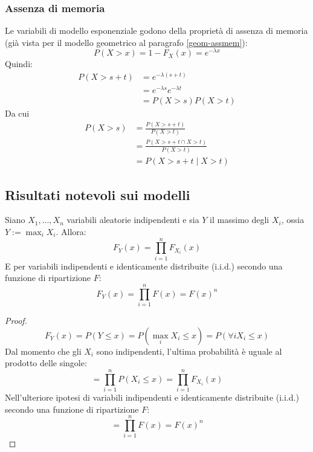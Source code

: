 \subsubsection{Assenza di memoria}
Le variabili di modello esponenziale godono della proprietà di assenza di memoria (già vista per il modello geometrico al paragrafo \ref{geom-assmem}):
\begin{equation*}
	P(X>x) = 1 - F_X(x) = e^{-\lambda x}
\end{equation*}
Quindi:
\begin{align*}
	P(X>s+t) & = e^{-\lambda (s+t)}           \\
	         & = e^{-\lambda s}e^{-\lambda t} \\
	         & = P(X>s)P(X>t)
\end{align*}
Da cui
\begin{align*}
	P(X>s) & = \frac{P(X>s+t)}{P(X>t)}         \\
	       & = \frac{P(X>s+t\cap X>t)}{P(X>t)} \\
	       & = P(X>s+t\mid X>t)
\end{align*}


\subsection{Risultati notevoli sui modelli}
\begin{prop}
	Siano $X_1,\dots,X_n$ variabili aleatorie indipendenti e sia $Y$ il massimo degli $X_i$, ossia $Y:=\max_i X_i$. Allora:
	\begin{equation*}
		F_Y(x) = \prod_{i=1}^n F_{X_i}(x)
	\end{equation*}
	E per variabili indipendenti e identicamente distribuite (i.i.d.) secondo una funzione di ripartizione $F$:
	\begin{equation*}
		F_Y(x) = \prod_{i=1}^n F(x) = F(x)^n
	\end{equation*}
\end{prop}
\begin{proof}
	\begin{equation*}
		F_Y(x) = P(Y\leq x) = P(\max_i X_i\leq x) = P(\forall i X_i\leq x)
	\end{equation*}
	Dal momento che gli $X_i$ sono indipendenti, l'ultima probabilità è uguale al prodotto delle singole:
	\begin{equation*}
		= \prod_{i=1}^n P(X_i \leq x) = \prod_{i=1}^n F_{X_i}(x)
	\end{equation*}
	Nell'ulteriore ipotesi di variabili indipendenti e identicamente distribuite (i.i.d.) secondo una funzione di ripartizione $F$:
	\begin{equation*}
		= \prod_{i=1}^n F(x) = F(x)^n
	\end{equation*}
\end{proof}

